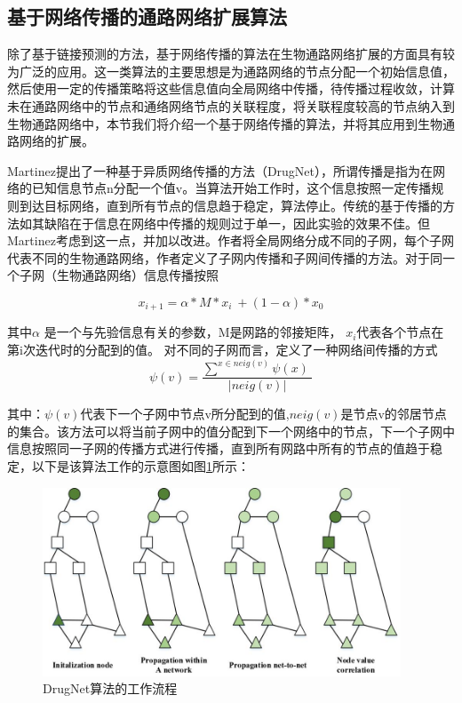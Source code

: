 \subsection{基于网络传播的通路网络扩展算法}
除了基于链接预测的方法，基于网络传播的算法在生物通路网络扩展的方面具有较为广泛的应用。这一类算法的主要思想是为通路网络的节点分配一个初始信息值，然后使用一定的传播策略将这些信息值向全局网络中传播，待传播过程收敛，计算未在通路网络中的节点和通络网络节点的关联程度，将关联程度较高的节点纳入到生物通路网络中，本节我们将介绍一个基于网络传播的算法，并将其应用到生物通路网络的扩展。

Martinez\cite{martinez2015drugnet}提出了一种基于异质网络传播的方法（DrugNet），所谓传播是指为在网络的已知信息节点n分配一个值v。当算法开始工作时，这个信息按照一定传播规则到达目标网络，直到所有节点的信息趋于稳定，算法停止。传统的基于传播的方法如\cite{vanunu2010associating}其缺陷在于信息在网络中传播的规则过于单一，因此实验的效果不佳。但Martinez\cite{martinez2015drugnet}考虑到这一点，并加以改进。作者将全局网络分成不同的子网，每个子网代表不同的生物通路网络，作者定义了子网内传播和子网间传播的方法。对于同一个子网（生物通路网络）信息传播按照

\begin{equation}
x_{i+1} =\alpha *M*x_{i} \ +( 1-\alpha ) *x_{0}
\label{eq321}
\end{equation}

其中$\alpha$ 是一个与先验信息有关的参数，M是网路的邻接矩阵， $x_{i}$代表各个节点在第i次迭代时的分配到的值。 对不同的子网而言，定义了一种网络间传播的方式
\begin{equation}
\psi (v) =\frac{\sum ^{x\in neig(v)} \psi (x) \ }{|neig(v) |}
\label{eq322}
\end{equation}

其中：$\psi(v)$代表下一个子网中节点v所分配到的值,$neig(v)$是节点v的邻居节点的集合。该方法可以将当前子网中的值分配到下一个网络中的节点，下一个子网中信息按照同一子网的传播方式进行传播，直到所有网路中所有的节点的值趋于稳定，以下是该算法工作的示意图如图\ref{fig41}所示：

\begin{figure}[h]
\centering
\includegraphics[width = 0.95\textwidth]{workflow}
\caption[fig41]{DrugNet算法的工作流程}
\label{fig41}
\end{figure}

